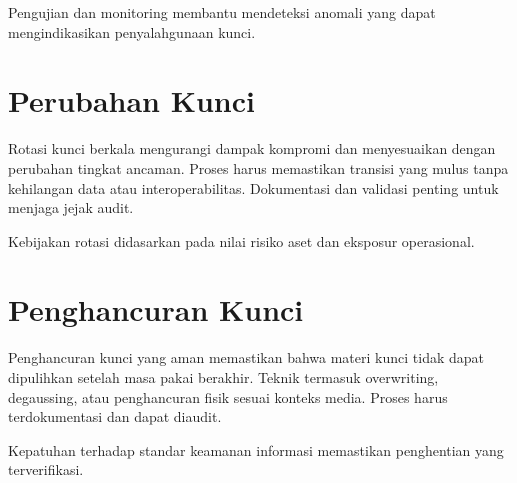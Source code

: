 \documentclass[../main.tex]{subfiles}
\begin{document}
Pengujian dan monitoring membantu mendeteksi anomali yang dapat mengindikasikan penyalahgunaan kunci.

\section{Perubahan Kunci}
Rotasi kunci berkala mengurangi dampak kompromi dan menyesuaikan dengan perubahan tingkat ancaman. Proses harus memastikan transisi yang mulus tanpa kehilangan data atau interoperabilitas. Dokumentasi dan validasi penting untuk menjaga jejak audit.

Kebijakan rotasi didasarkan pada nilai risiko aset dan eksposur operasional.

\section{Penghancuran Kunci}
Penghancuran kunci yang aman memastikan bahwa materi kunci tidak dapat dipulihkan setelah masa pakai berakhir. Teknik termasuk overwriting, degaussing, atau penghancuran fisik sesuai konteks media. Proses harus terdokumentasi dan dapat diaudit.

Kepatuhan terhadap standar keamanan informasi memastikan penghentian yang terverifikasi.
\end{document}
